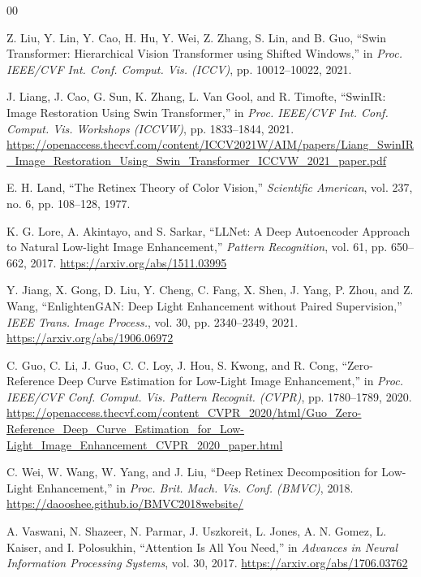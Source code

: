 \documentclass[conference]{IEEEtran}
\begin{document}
\begin{thebibliography}{00}

Z. Liu, Y. Lin, Y. Cao, H. Hu, Y. Wei, Z. Zhang, S. Lin, and B. Guo, ``Swin Transformer: Hierarchical Vision Transformer using Shifted Windows,'' in \textit{Proc. IEEE/CVF Int. Conf. Comput. Vis. (ICCV)}, pp. 10012--10022, 2021.

J. Liang, J. Cao, G. Sun, K. Zhang, L. Van Gool, and R. Timofte, ``SwinIR: Image Restoration Using Swin Transformer,'' in \textit{Proc. IEEE/CVF Int. Conf. Comput. Vis. Workshops (ICCVW)}, pp. 1833--1844, 2021. \url{https://openaccess.thecvf.com/content/ICCV2021W/AIM/papers/Liang_SwinIR_Image_Restoration_Using_Swin_Transformer_ICCVW_2021_paper.pdf}

E. H. Land, ``The Retinex Theory of Color Vision,'' \textit{Scientific American}, vol. 237, no. 6, pp. 108--128, 1977.

K. G. Lore, A. Akintayo, and S. Sarkar, ``LLNet: A Deep Autoencoder Approach to Natural Low-light Image Enhancement,'' \textit{Pattern Recognition}, vol. 61, pp. 650--662, 2017. \url{https://arxiv.org/abs/1511.03995}

Y. Jiang, X. Gong, D. Liu, Y. Cheng, C. Fang, X. Shen, J. Yang, P. Zhou, and Z. Wang, ``EnlightenGAN: Deep Light Enhancement without Paired Supervision,'' \textit{IEEE Trans. Image Process.}, vol. 30, pp. 2340--2349, 2021. \url{https://arxiv.org/abs/1906.06972}

C. Guo, C. Li, J. Guo, C. C. Loy, J. Hou, S. Kwong, and R. Cong, ``Zero-Reference Deep Curve Estimation for Low-Light Image Enhancement,'' in \textit{Proc. IEEE/CVF Conf. Comput. Vis. Pattern Recognit. (CVPR)}, pp. 1780--1789, 2020. \url{https://openaccess.thecvf.com/content_CVPR_2020/html/Guo_Zero-Reference_Deep_Curve_Estimation_for_Low-Light_Image_Enhancement_CVPR_2020_paper.html}

C. Wei, W. Wang, W. Yang, and J. Liu, ``Deep Retinex Decomposition for Low-Light Enhancement,'' in \textit{Proc. Brit. Mach. Vis. Conf. (BMVC)}, 2018. \url{https://daooshee.github.io/BMVC2018website/}

A. Vaswani, N. Shazeer, N. Parmar, J. Uszkoreit, L. Jones, A. N. Gomez, L. Kaiser, and I. Polosukhin, ``Attention Is All You Need,'' in \textit{Advances in Neural Information Processing Systems}, vol. 30, 2017. \url{https://arxiv.org/abs/1706.03762}


\end{thebibliography}
\end{document}
